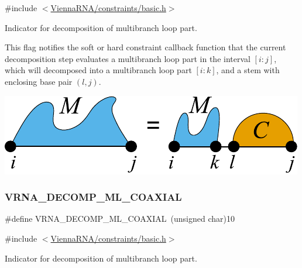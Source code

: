 {\ttfamily \#include $<$\hyperlink{constraints_2basic_8h}{Vienna\+R\+N\+A/constraints/basic.\+h}$>$}



Indicator for decomposition of multibranch loop part. 

This flag notifies the soft or hard constraint callback function that the current decomposition step evaluates a multibranch loop part in the interval $[i:j]$, which will decomposed into a multibranch loop part $[i:k]$, and a stem with enclosing base pair $(l,j)$.

 
\begin{DoxyImageNoCaption}
  \mbox{\includegraphics[width=\textwidth,height=\textheight/2,keepaspectratio=true]{decomp_ml_ml_stem}}
\end{DoxyImageNoCaption}
 \mbox{\label{group__constraints_ga4fe48d575830b16c208e280e01ab1497}} 
\subsubsection{\texorpdfstring{V\+R\+N\+A\+\_\+\+D\+E\+C\+O\+M\+P\+\_\+\+M\+L\+\_\+\+C\+O\+A\+X\+I\+AL}{VRNA\_DECOMP\_ML\_COAXIAL}}
{\footnotesize\ttfamily \#define V\+R\+N\+A\+\_\+\+D\+E\+C\+O\+M\+P\+\_\+\+M\+L\+\_\+\+C\+O\+A\+X\+I\+AL~(unsigned char)10}



{\ttfamily \#include $<$\hyperlink{constraints_2basic_8h}{Vienna\+R\+N\+A/constraints/basic.\+h}$>$}



Indicator for decomposition of multibranch loop part. 

